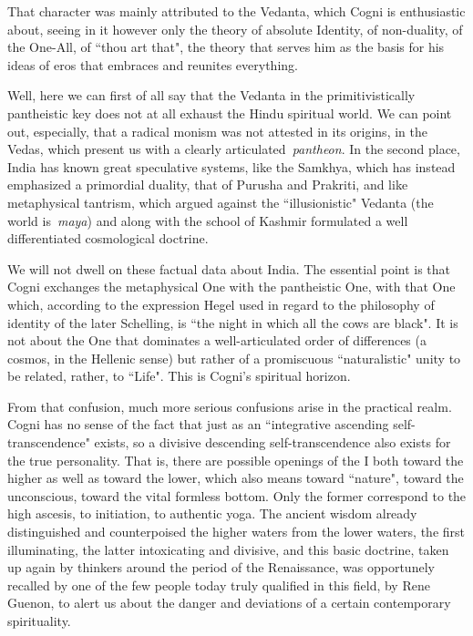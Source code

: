 That character was mainly attributed to the Vedanta, which Cogni is enthusiastic about, seeing in it however only the
theory of absolute Identity, of non-duality, of the One-All, of ``thou art that", the theory that serves him as the
basis for his ideas of eros that embraces and reunites everything.

Well, here we can first of all say that the Vedanta in the primitivistically pantheistic key does not at all exhaust the
Hindu spiritual world. We can point out, especially, that a radical monism was not attested in its origins, in the
Vedas, which present us with a clearly articulated \emph{pantheon}. In the second place, India has known great
speculative systems, like the Samkhya, which has instead emphasized a primordial duality, that of Purusha and Prakriti,
and like metaphysical tantrism, which argued against the ``illusionistic" Vedanta (the world is \emph{maya}) and along
with the school of Kashmir formulated a well differentiated cosmological doctrine.

We will not dwell on these factual data about India. The essential point is that Cogni exchanges the metaphysical One
with the pantheistic One, with that One which, according to the expression Hegel used in regard to the philosophy of
identity of the later Schelling, is ``the night in which all the cows are black". It is not about the One that dominates
a well-articulated order of differences (a cosmos, in the Hellenic sense) but rather of a promiscuous ``naturalistic"
unity to be related, rather, to ``Life". This is Cogni's spiritual horizon.

From that confusion, much more serious confusions arise in the practical realm. Cogni has no sense of the fact that just
as an ``integrative ascending self-transcendence" exists, so a divisive descending self-transcendence also exists for
the true personality. That is, there are possible openings of the I both toward the higher as well as toward the lower,
which also means toward ``nature", toward the unconscious, toward the vital formless bottom. Only the former correspond
to the high ascesis, to initiation, to authentic yoga. The ancient wisdom already distinguished and counterpoised the
higher waters from the lower waters, the first illuminating, the latter intoxicating and divisive, and this basic
doctrine, taken up again by thinkers around the period of the Renaissance, was opportunely recalled by one of the few
people today truly qualified in this field, by Rene Guenon, to alert us about the danger and deviations of a certain
contemporary spirituality.

